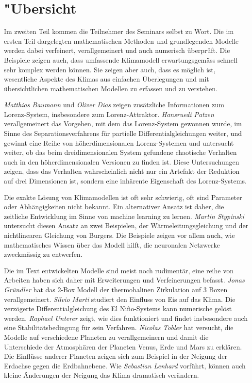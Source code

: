 %
%
%
\chapter*{"Ubersicht}
\rhead{}
\label{skript:uebersicht}
Im zweiten Teil kommen die Teilnehmer des Seminars selbst zu Wort.
Die im ersten Teil dargelegten mathematischen Methoden und
grundlegenden Modelle werden dabei verfeinert, verallgemeinert
und auch numerisch überprüft.
Die Beispiele zeigen auch, dass umfassende Klimamodell erwartungsgemäss
schnell sehr komplex werden können.
Sie zeigen aber auch, dass es möglich ist, wesentliche Aspekte
des Klimas aus einfachen Überlegungen und mit übersichtlichen
mathematischen Modellen zu erfassen und zu verstehen.

{\em Matthias Baumann} und {\em Oliver Dias} zeigen zusätzliche
Informationen zum Lorenz-System, insbesondere zum Lorenz-Attraktor.
{\em Hansruedi Patzen} verallgemeinert das Vorgehen, mit dem das
Lorenz-System gewonnen wurde, im Sinne des Separationsverfahrens
für partielle Differentialgleichungen weiter, und gewinnt eine
Reihe von höherdimensionalen Lorenz-Systemen und untersucht weiter,
ob das beim dreidimensionalen System gefundene chaotische Verhalten 
auch in den höherdimensionalen Versionen zu finden ist.
Diese Untersuchungen zeigen, dass das Verhalten wahrscheinlich
nicht nur ein Artefakt der Reduktion auf drei Dimensionen ist, sondern
eine inhärente Eigenschaft des Lorenz-Systems.

Die exakte Lösung von Klimamodellen ist oft sehr schwierig, oft sind
Parameter oder Abhängigkeiten nicht bekannt.
Ein alternativer Ansatz ist daher, die zeitliche Entwicklung
im Sinne von machine learning zu lernen.
{\em Martin Stypinski} untersucht diesen Ansatz an zwei Beispielen,
der Wärmeleitungsgleichung und der nichtlinearen Gleichung von Burgers.
Die Beispiele zeigen vor allem auch, wie mathematisches Wissen über das
Modell hilft, die neuronalen Netzwerke zweckmässig zu entwerfen.

Die im Text entwickelten Modelle sind meist noch rudimentär, eine
reihe von Arbeiten haben sich daher mit Erweiterungen und Verfeinerungen
befasst.
{\em Jonas Gründler} hat das 2-Box Modell der thermohalinen Zirkulation
auf 3 Boxen verallgemeinert.
{\em Silvio Marti} studiert den Einfluss von Eis auf das Klima.
Die verzögerte Differentialgleichung des El Niño-Systems kann
numerische gelöst werden. {\em Raphael Unterer} zeigt, wie dies
funktioniert und findet insbesondere auch eine Stabilitätsbedingung
für sein Verfahren.
{\em Nicolas Tobler} hat versucht, die Modelle auf verschiedene
Planeten zu verallgemeinern und damit die Unterschiede der Atmosphären
der Planeten Venus, Erde und Mars zu erklären.
Die Einflüsse anderer Planeten zeigen sich zum Beispiel in der
Neigung der Erdachse gegen die Erdbahnebene.
Wie {\em Sebastian Lenhard} vorführt, können auch kleine Änderungen
der Neigung das Klima dramatisch verändern.

